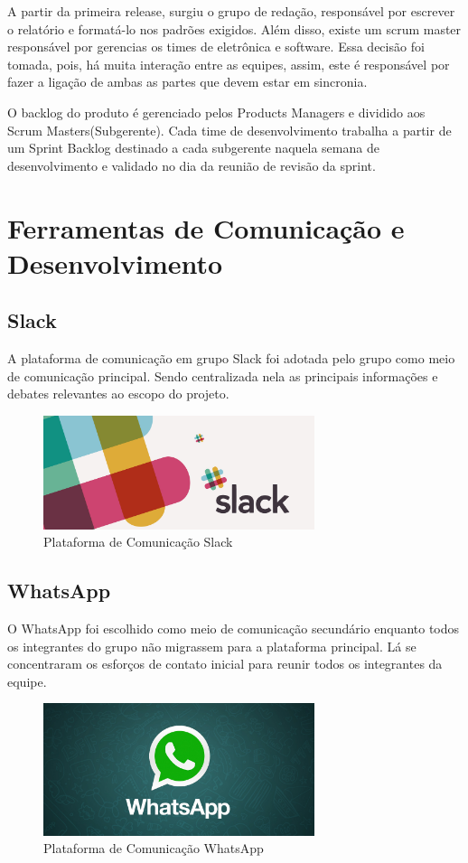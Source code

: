 A partir da primeira release, surgiu o grupo de redação, responsável por escrever
o relatório e formatá-lo nos padrões exigidos. Além disso, existe um scrum master
responsável por gerencias os times de eletrônica e software. Essa decisão foi tomada,
pois, há muita interação entre as equipes, assim, este é responsável por fazer a ligação
de ambas as partes que devem estar em sincronia.

O backlog do produto é gerenciado pelos Products Managers e dividido aos Scrum Masters(Subgerente).
Cada time de desenvolvimento trabalha a partir de um Sprint Backlog destinado a cada
subgerente naquela semana de desenvolvimento e validado no dia da reunião de revisão
da sprint.

\section{Ferramentas de Comunicação e Desenvolvimento}
\subsection{Slack}
A plataforma de comunicação em grupo Slack foi adotada pelo grupo como meio de comunicação principal.
Sendo centralizada nela as principais informações e debates relevantes ao escopo do projeto.

\begin{figure}[h]
  \centering
  \includegraphics[width=300px, scale=0.5]{figuras/slack}
  \caption{Plataforma de Comunicação Slack}
  \label{table:slack}
\end{figure}


\subsection{WhatsApp}
O WhatsApp foi escolhido como meio de comunicação secundário enquanto todos os integrantes do grupo
não migrassem para a plataforma principal. Lá se concentraram os esforços de contato inicial para reunir
todos os integrantes da equipe.

\begin{figure}[h]
  \centering
  \includegraphics[width=300px, scale=0.5]{figuras/wpp}
  \caption{Plataforma de Comunicação WhatsApp}
  \label{table:wpp}
\end{figure}


